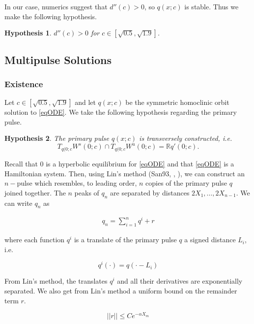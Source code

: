 \documentclass[12pt]{article}
\def\R{{\mathbb R}}
\newtheorem{hypothesis}{Hypothesis}
\begin{document}
In our case, numerics suggest that $d''(c) > 0$, so $q(x; c)$ is stable. Thus we make the following hypothesis.

\begin{hypothesis}\label{hypdccpos}
$d''(c) > 0$ for $c \in [\sqrt{0.5}, \sqrt{1.9}]$.
\end{hypothesis}


\subsection{Multipulse Solutions}

\subsubsection{Existence}

Let $c \in [\sqrt{0.5}, \sqrt{1.9}]$ and let $q(x; c)$ be the symmetric homoclinic orbit solution to \eqref{eqODE}. We take the following hypothesis regarding the primary pulse.

\begin{hypothesis}\label{transverseq}
The primary pulse $q(x; c)$ is transversely constructed, i.e. 
\[
T_{q(0; c} W^s(0; c) \cap T_{q(0; c} W^u(0; c) = \R q'(0; c).
\]
\end{hypothesis}

Recall that 0 is a hyperbolic equilibrium for \eqref{eqODE} and that \eqref{eqODE} is a Hamiltonian system. Then, using Lin's method (San93, \cite{Sandstede1998}, \cite{Sandstede1997}), we can construct an $n-$pulse which resembles, to leading order, $n$ copies of the primary pulse $q$ joined together. The $n$ peaks of $q_n$ are separated by distances $2 X_1, \dots, 2 X_{n-1}$. We can write $q_n$ as 

\begin{align}\label{qn}
q_n = \sum_{i = 1}^{n} q^i + r
\end{align}

where each function $q^i$ is a translate of the primary pulse $q$ a signed distance $L_i$, i.e. 

\begin{equation}\label{qi}
q^i(\cdot) = q(\cdot - L_i)
\end{equation}

From Lin's method, the translates $q^i$ and all their derivatives are exponentially separated. We also get from Lin's method a uniform bound on the remainder term $r$.

\begin{equation}
||r|| \leq C e^{-\alpha X_m}
\end{equation}
\end{document}

